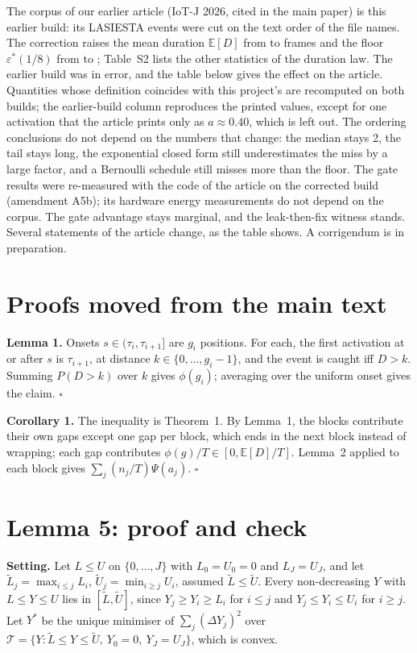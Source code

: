 \documentclass[10pt]{article}
\newcommand{\eps}{\varepsilon}
\newcommand{\E}{\mathbb{E}}
\begin{document}
The corpus of our earlier article (IoT-J 2026, cited in the main paper) is this earlier build: its LASIESTA events were cut on the text order of the file names. The correction raises the mean duration $\E[D]$ from \VoneED{} to \ED{} frames and the floor $\eps^*(1/8)$ from \VoneEpsEight{} to \epsKeight{}; Table~S2 lists the other statistics of the duration law. The earlier build was in error, and the table below gives the effect on the article. Quantities whose definition coincides with this project's are recomputed on both builds; the earlier-build column reproduces the printed values, except for one activation that the article prints only as $a\approx0.40$, which is left out. The ordering conclusions do not depend on the numbers that change: the median stays 2, the tail stays long, the exponential closed form still underestimates the miss by a large factor, and a Bernoulli schedule still misses more than the floor. The gate results were re-measured with the code of the article on the corrected build (amendment A5b); its hardware energy measurements do not depend on the corpus. The gate advantage stays marginal, and the leak-then-fix witness stands. Several statements of the article change, as the table shows. A corrigendum is in preparation.



\section{Proofs moved from the main text}
\textbf{Lemma 1.} Onsets $s\in(\tau_i,\tau_{i+1}]$ are $g_i$ positions. For each, the first activation at or after $s$ is $\tau_{i+1}$, at distance $k\in\{0,\dots,g_i-1\}$, and the event is caught iff $D>k$. Summing $P(D>k)$ over $k$ gives $\phi(g_i)$; averaging over the uniform onset gives the claim. $\square$

\textbf{Corollary 1.} The inequality is Theorem~1. By Lemma~1, the blocks contribute their own gaps except one gap per block, which ends in the next block instead of wrapping; each gap contributes $\phi(g)/T\in[0,\E[D]/T]$. Lemma~2 applied to each block gives $\sum_j(n_j/T)\Psi(a_j)$. $\square$

\section{Lemma 5: proof and check}
\textbf{Setting.} Let $L\le U$ on $\{0,\dots,J\}$ with $L_0=U_0=0$ and $L_J=U_J$, and let $\tilde L_j=\max_{i\le j}L_i$, $\tilde U_j=\min_{i\ge j}U_i$, assumed $\tilde L\le\tilde U$. Every non-decreasing $Y$ with $L\le Y\le U$ lies in $[\tilde L,\tilde U]$, since $Y_j\ge Y_i\ge L_i$ for $i\le j$ and $Y_j\le Y_i\le U_i$ for $i\ge j$. Let $Y^*$ be the unique minimiser of $\sum_j(\Delta Y_j)^2$ over $\mathcal{T}=\{Y:\tilde L\le Y\le\tilde U,\ Y_0=0,\ Y_J=U_J\}$, which is convex.
\end{document}
